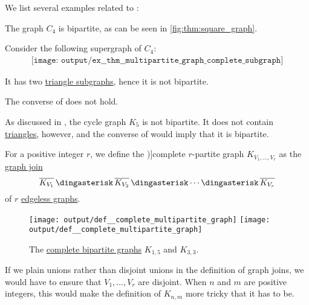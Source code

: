 \begin{example}\label{ex:thm:multipartite_graph_complete_subgraph}
  We list several examples related to :
  \begin{thmenum}
     The graph \( C_4 \) is bipartite, as can be seen in \cref{fig:thm:square_graph}.

    Consider the following supergraph of \( C_4 \):
    \begin{equation}\label{eq:ex:thm:multipartite_graph_complete_subgraph/triangle}
      \begin{aligned}
        \texttt{[image: output/ex\_\_thm\_\_multipartite\_graph\_complete\_subgraph]}
      \end{aligned}
    \end{equation}

    It has two \hyperref[def:triangle_graph]{triangle subgraphs}, hence it is not bipartite.

     The converse of  does not hold.

    As discussed in , the cycle graph \( K_5 \) is not bipartite. It does not contain \hyperref[def:triangle_graph]{triangles}, however, and the converse of  would imply that it is bipartite.
  \end{thmenum}
\end{example}

\begin{definition}\label{def:complete_multipartite_graph}
  For a positive integer \( r \), we define the \term[ru=полный \( r \)-дольный (граф) (\cite[\S 1]{ЕмеличевИПр1990Графы})]{complete \( r \)-partite} graph \( K_{V_1,\ldots,V_r} \) as the \hyperref[def:graph_join]{graph join}
  \begin{equation*}
    \oline{K_{V_1}} \Ast \oline{K_{V_2}} \Ast \cdots \Ast \oline{K_{V_r}}
  \end{equation*}
  of \( r \) \hyperref[def:edgeless_graph]{edgeless graphs}.

  \begin{figure}[!ht]
    \hfill
    \texttt{[image: output/def\_\_complete\_multipartite\_graph]}
    \hfill
    \texttt{[image: output/def\_\_complete\_multipartite\_graph]}
    \hfill
    \hfill
    \caption{The \hyperref[def:complete_multipartite_graph]{complete bipartite graphs} \( K_{1,5} \) and \( K_{3,3} \).}\label{fig:def:complete_multipartite_graph}
  \end{figure}
\end{definition}
\begin{comments}
  \item If we plain unions rather than disjoint unions in the definition of graph joins, we would have to ensure that \( V_1, \ldots, V_r \) are disjoint. When \( n \) and \( m \) are positive integers, this would make the definition of \( K_{n,m} \) more tricky that it has to be.
\end{comments}

